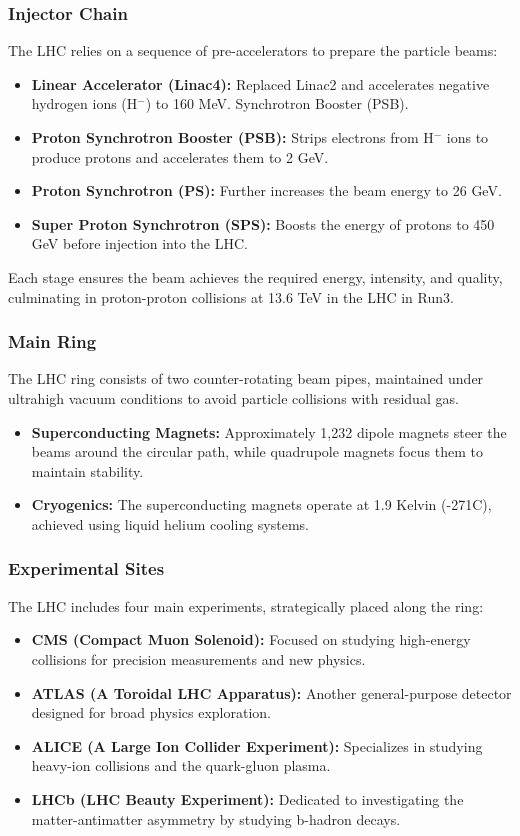 \subsubsection{Injector Chain}
The LHC relies on a sequence of pre-accelerators to prepare the particle beams:
\begin{itemize}
    \item \textbf{Linear Accelerator (Linac4):} Replaced Linac2 and accelerates negative hydrogen ions (H$^-$) to 160 MeV. Synchrotron Booster (PSB). \cite{linac4}
    \item \textbf{Proton Synchrotron Booster (PSB):} Strips electrons from H$^-$ ions to produce protons and accelerates them to 2 GeV. \cite{psb}
    \item \textbf{Proton Synchrotron (PS):} Further increases the beam energy to 26 GeV.\cite{ps}
    \item \textbf{Super Proton Synchrotron (SPS):} Boosts the energy of protons to 450 GeV before injection into the LHC.\cite{sps}
\end{itemize}
Each stage ensures the beam achieves the required energy, intensity, and quality, culminating in proton-proton collisions at 13.6 TeV in the LHC in Run3.

\subsubsection{Main Ring}
The LHC ring consists of two counter-rotating beam pipes, maintained under ultrahigh vacuum conditions to avoid particle collisions with residual gas.
\begin{itemize}
    \item \textbf{Superconducting Magnets:} Approximately 1,232 dipole magnets steer the beams around the circular path, while quadrupole magnets focus them to maintain stability. \cite{superconducting}
    \item \textbf{Cryogenics:} The superconducting magnets operate at 1.9 Kelvin (-271\degree C), achieved using liquid helium cooling systems. \cite{lhc_2024}
\end{itemize}

\subsubsection{Experimental Sites}
The LHC includes four main experiments, strategically placed along the ring:
\begin{itemize}
    \item \textbf{CMS (Compact Muon Solenoid):} Focused on studying high-energy collisions for precision measurements and new physics.
    \item \textbf{ATLAS (A Toroidal LHC Apparatus):} Another general-purpose detector designed for broad physics exploration.
    \item \textbf{ALICE (A Large Ion Collider Experiment):} Specializes in studying heavy-ion collisions and the quark-gluon plasma.
    \item \textbf{LHCb (LHC Beauty Experiment):} Dedicated to investigating the matter-antimatter asymmetry by studying b-hadron decays.
\end{itemize}

